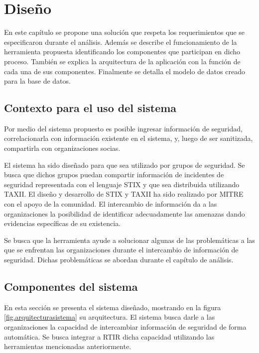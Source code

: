 \makeatother
\setlength\tabcolsep{1mm}
\renewcommand\arraystretch{1.3}
\renewcommand\theFigura{\arabic{FiguraCap4}}
\renewcommand\theTabla{\arabic{TablaCap4}}

\chapter{Diseño}
\label{capitulo4}
	En este capítulo se propone una solución que respeta los requerimientos que se especificaron
		durante el análisis. Además se describe el funcionamiento de la herramienta propuesta identificando los componentes que
		participan en dicho proceso. También se explica la arquitectura de la aplicación con la función de cada una de sus
		componentes. Finalmente se detalla el modelo de datos creado para la base de datos.
	
	\section{Contexto para el uso del sistema} 
	Por medio del sistema propuesto es posible ingresar información de seguridad, correlacionarla
		con información existente en el sistema, y, luego de ser sanitizada, compartirla con organizaciones socias.
	
	
	\bigskip
	
	El sistema ha sido diseñado para que sea utilizado por grupos de seguridad. Se busca que
		dichos grupos puedan compartir información de incidentes de seguridad representada con el lenguaje STIX y que sea
		distribuida utilizando TAXII. El diseño y desarrollo de STIX y TAXII ha sido realizado por MITRE con el apoyo de la
		comunidad. El intercambio de información da a las organizaciones la posibilidad de identificar adecuadamente las
		amenazas dando evidencias específicas de su existencia.
	
	
	\bigskip
	
	Se busca que la herramienta ayude a solucionar algunas de las problemáticas a las que se
		enfrentan las organizaciones durante el intercambio de información de seguridad. Dichas problemáticas se abordan
		durante el capítulo de análisis.
	
	\section{Componentes del sistema}
	
	\bigskip
	
	En esta sección se presenta el sistema diseñado, mostrando en la figura \ref{fig.arquitecturasistema} su arquitectura. El sistema busca darle a las organizaciones la capacidad de intercambiar
		información de seguridad de forma automática. Se busca integrar a RTIR dicha capacidad utilizando las herramientas
		mencionadas anteriormente.
	
